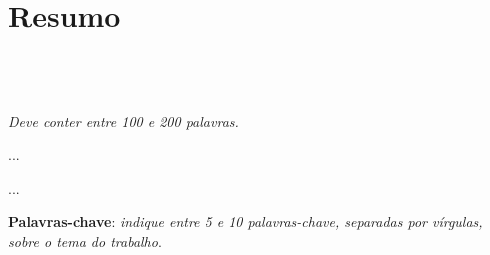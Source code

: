 \chapter{Resumo}
\section*{\textit{\TITULO}\\  {\small{\textit{\SUBTITULO}}}}


\textit{Deve conter entre 100 e 200 palavras.}

...

...



\textbf{Palavras-chave}: \textit{indique entre 5 e 10 palavras-chave, separadas por vírgulas, sobre o tema do trabalho}.